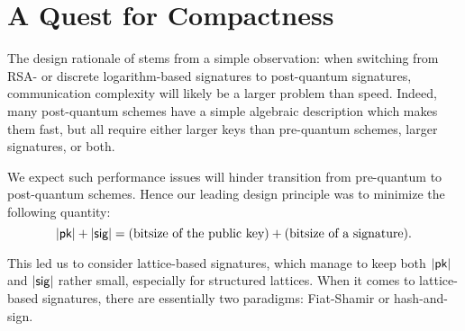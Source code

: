 %

\section{A Quest for Compactness}

The design rationale of \falcon stems from a simple observation: when switching from RSA- or discrete logarithm-based signatures to post-quantum signatures, communication complexity will likely be a larger problem than speed. Indeed, many post-quantum schemes have a simple algebraic description which makes them fast, but all require either larger keys than pre-quantum schemes, larger signatures, or both.

\medskip

We expect such performance issues will hinder transition from pre-quantum to post-quantum schemes. Hence our leading design principle was to minimize the following quantity:
 $$|\textsf{pk}|+|\textsf{sig}| = \text{(bitsize of the public key)} + \text{(bitsize of a signature)}.$$

\medskip

This led us to consider lattice-based signatures, which manage to keep both $|\textsf{pk}|$ and $|\textsf{sig}|$ rather small, especially for structured lattices. When it comes to lattice-based signatures, there are essentially two paradigms: Fiat-Shamir or hash-and-sign.

